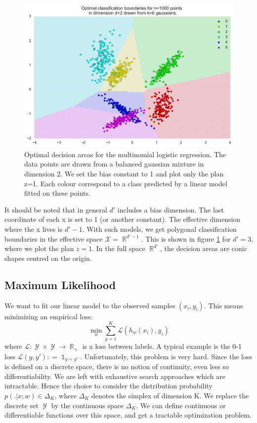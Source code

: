 \documentclass{article}
\DeclareMathOperator{\R}{\mathbb{R}}
\DeclareMathOperator{\1}{\mathbb{1}}
\DeclareMathOperator{\Y}{\mathcal{Y}}
\begin{document}
\begin{figure}[ht]
	\includegraphics[width=\textwidth]{images/linear_classification.pdf}
	\caption{Optimal decision areas for the multinomial logistic regression.
	The data points are drawn from a balanced gaussian mixture in dimension 2.
	We set the bias constant to 1 and plot only the plan z=1.
	Each colour correspond to a class predicted by a linear model fitted on these points.}
	\label{linear boundaries}
\end{figure}

It should be noted that in general $d'$ includes a bias dimension.
The last coordinate of each x is set to 1 (or another constant).
The effective dimension where the x lives is $d'-1$.
With such models, we get polygonal classification boundaries in the effective space $\mathcal X = \R^{d'-1}$.
This is shown in figure \ref{linear boundaries} for $d'=3$, where we plot the plan $z=1$.
In the full space $\R^{d'}$, the decision areas are conic shapes centred on the origin.


 \subsection{Maximum Likelihood}

We want to fit our linear model to the observed samples $(x_i, y_i)$.
This means minimizing an empirical loss:
\begin{equation*}
	\min_w \sum_{y=1}^K \mathcal L (h_w(x_i),y_i)
\end{equation*}
where $\mathcal L: \Y \times \Y \rightarrow \R_+$ is a loss between labels.
A typical example is the 0-1 loss $\mathcal L(y, y') : = \1_{y=y'}$.
Unfortunately, this problem is very hard.
Since the loss is defined on a discrete space, there is no notion of continuity, even less so differentiability.
We are left with exhaustive search approaches which are intractable.
Hence the choice to consider the distribution probability $p( . | x ; w) \in \Delta_K$, where $\Delta_K$ denotes the simplex of dimension K.
We replace the discrete set $\Y$ by the continuous space $\Delta_K$.
We can define continuous or differentiable functions over this space, and get a tractable optimization problem.
 
\end{document}

